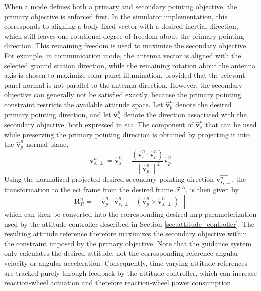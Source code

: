 When a mode defines both a primary and secondary pointing objective, the primary objective is enforced first. In the simulator implementation, this corresponds to aligning a body-fixed vector with a desired inertial direction, which still leaves one rotational degree of freedom about the primary pointing direction. This remaining freedom is used to maximize the secondary objective. For example, in communication mode, the antenna vector is aligned with the selected ground station direction, while the remaining rotation about the antenna axis is chosen to maximize solar-panel illumination, provided that the relevant panel normal is not parallel to the antenna direction. However, the secondary objective can generally not be satisfied exactly, because the primary pointing constraint restricts the available attitude space. Let $\hat{\mathbf{v}}_p^n$ denote the desired primary pointing direction, and let $\hat{\mathbf{v}}_s^n$ denote the direction associated with the secondary objective, both expressed in \gls{eci}. The component of $\hat{\mathbf{v}}_s^n$ that can be used while preserving the primary pointing direction is obtained by projecting it into the $\hat{\mathbf{v}}_p^n$-normal plane,
\begin{equation}
    \mathbf{v}_{s,\perp}^n = \hat{\mathbf{v}}_s^n - 
    \frac{
    \left(\hat{\mathbf{v}}_s^n \cdot \hat{\mathbf{v}}_p^n\right)
    }{
    \left\|
    \hat{\mathbf{v}}_p^n
    \right\|^2
    }\hat{\mathbf{v}}_p^n
    \label{eq:secondary_pointing_projection}
\end{equation}
Using the normalized projected desired secondary pointing direction $\hat{\mathbf{v}_{s,\perp}^n}$, the transformation to the \gls{eci} frame from the desired frame $\mathcal{F}^R$, is then given by
\begin{equation}
    \boldsymbol{R}^n_R = \begin{bmatrix}
        \hat{\mathbf{v}}_p^n & \hat{\mathbf{v}}_{s,\perp}^n & \left(\hat{\mathbf{v}}_p^n \times \hat{\mathbf{v}}_{s,\perp}^n\right)
    \end{bmatrix}
\end{equation}
which can then be converted into the corresponding desired \gls{mrp} parameterization used by the attitude controller described in Section \ref{sec:attitude_controller}. The resulting attitude reference therefore maximizes the secondary objective within the constraint imposed by the primary objective. Note that the guidance system only calculates the desired attitude, not the corresponding reference angular velocity or angular acceleration. Consequently, time-varying attitude references are tracked purely through feedback by the attitude controller, which can increase reaction-wheel actuation and therefore reaction-wheel power consumption.



